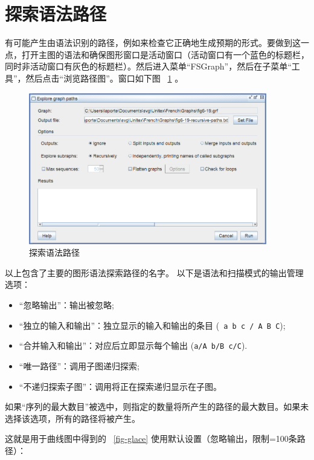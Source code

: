 \section{探索语法路径}

有可能产生由语法识别的路径，例如来检查它正确地生成预期的形式。要做到这一点，打开主图的语法和确保图形窗口是活动窗口（活动窗口有一个蓝色的标题栏，同时非活动窗口有灰色的标题栏）。然后进入菜单“FSGraph”，然后在子菜单“工具”，然后点击“浏览路径图”。窗口如下图
~\ref{fig-explore-graph-paths} 。


\begin{figure}[!h]
\begin{center}
\includegraphics[width=10.4cm]{resources/img/fig6-18.png}
\caption{探索语法路径\label{fig-explore-graph-paths}}
\end{center}
\end{figure}

\bigskip
\noindent 以上包含了主要的图形语法探索路径的名字。
以下是语法和扫描模式的输出管理选项：


\begin{itemize}
  \item “忽略输出”：输出被忽略;
  \item “独立的输入和输出”：独立显示的输入和输出的条目
  (\verb$ a b c / A B C$);
  \item “合并输入和输出”：对应后立即显示每个输出
  (\verb$a/A b/B c/C$).
  \item “唯一路径”：调用子图递归探索;
  \item “不递归探索子图”：调用将正在探索递归显示在子图。
\end{itemize}

\noindent 如果“序列的最大数目”被选中，则指定的数量将所产生的路径的最大数目。如果未选择该选项，所有的路径将被产生。


\bigskip
\noindent 这就是用于曲线图中得到的 ~\ref{fig-glace} 
使用默认设置（忽略输出，限制=100条路径）：


